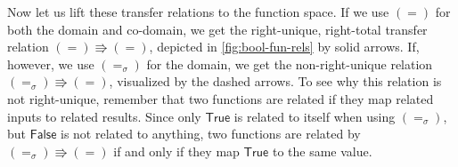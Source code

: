 \documentclass{article}
\theoremstyle{definition}
\newcommand{\true}{\mathsf{True}}
\newcommand{\false}{\mathsf{False}}
\begin{document}
Now let us lift these transfer relations to the function space.
If we use \((=)\) for both the domain and co-domain, we get the right-unique, right-total transfer relation \((=) \Rrightarrow (=)\),
depicted in \cref{fig:bool-fun-rels} by solid arrows.
If, however, we use \((=_\sigma)\) for the domain,
we get the non-right-unique relation \((=_\sigma) \Rrightarrow (=)\),
visualized by the dashed arrows.
To see why this relation is not right-unique,
remember that two functions are related if they map related inputs to related results.
Since only \(\true\) is related to itself when using \((=_\sigma)\),
but \(\false\) is not related to anything,
two functions are related by \((=_\sigma) \Rrightarrow (=)\) if and only if they map \(\true\) to the same value.
\end{document}
